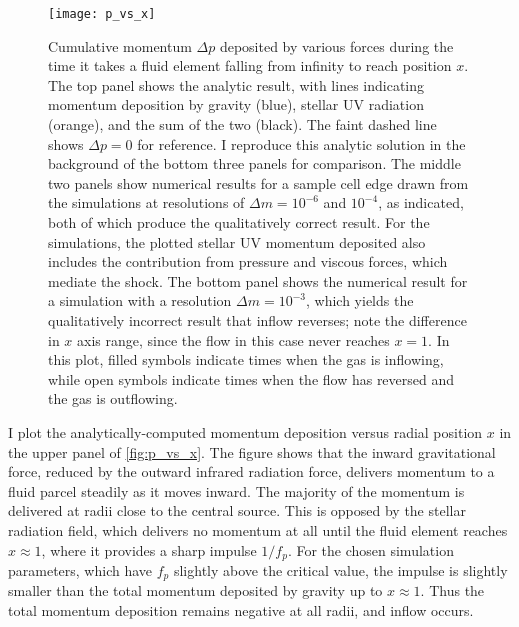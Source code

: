 \documentclass[useAMS,usenatbib]{mn2e}
\begin{document}
\begin{figure}
\texttt{[image: p\_vs\_x]}
\caption{
\label{fig:p_vs_x}
Cumulative momentum $\Delta p$ deposited by various forces during the time it takes a fluid element falling from infinity to reach position $x$. The top panel shows the analytic result, with lines indicating momentum deposition by gravity (blue), stellar UV radiation (orange), and the sum of the two (black). The faint dashed line shows $\Delta p = 0$ for reference. I reproduce this analytic solution in the background of the bottom three panels for comparison. The middle two panels show numerical results for a sample cell edge drawn from the simulations at resolutions of $\Delta m = 10^{-6}$ and $10^{-4}$, as indicated, both of which produce the qualitatively correct result. For the simulations, the plotted stellar UV momentum deposited also includes the contribution from pressure and viscous forces, which mediate the shock. The bottom panel shows the numerical result for a simulation with a resolution $\Delta m = 10^{-3}$, which yields the qualitatively incorrect result that inflow reverses; note the difference in $x$ axis range, since the flow in this case never reaches $x=1$. In this plot, filled symbols indicate times when the gas is inflowing, while open symbols indicate times when the flow has reversed and the gas is outflowing.
}
\end{figure}

I plot the analytically-computed momentum deposition versus radial position $x$ in the upper panel of \autoref{fig:p_vs_x}. The figure shows that the inward gravitational force, reduced by the outward infrared radiation force, delivers momentum to a fluid parcel steadily as it moves inward. The majority of the momentum is delivered at radii close to the central source. This is opposed by the stellar radiation field, which delivers no momentum at all until the fluid element reaches $x\approx 1$, where it provides a sharp impulse $1/f_p$. For the chosen simulation parameters, which have $f_p$ slightly above the critical value, the impulse is slightly smaller than the total momentum deposited by gravity up to $x \approx 1$. Thus the total momentum deposition remains negative at all radii, and inflow occurs.
\end{document}
